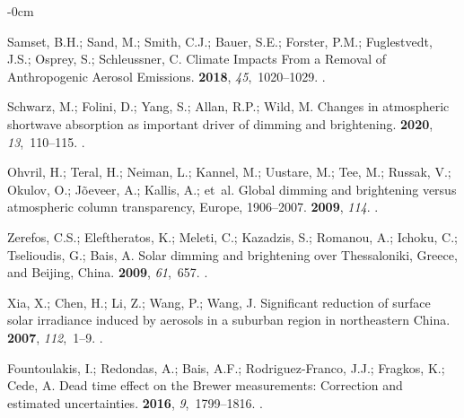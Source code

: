 \documentclass[applsci,article,accept,moreauthors,pdftex]{Definitions/mdpi}
\begin{document}
\begin{adjustwidth}{-\extralength}{0cm}
\begin{thebibliography}{999}
Samset, B.H.; Sand, M.; Smith, C.J.; Bauer, S.E.; Forster, P.M.; Fuglestvedt,
  J.S.; Osprey, S.; Schleussner, C.
\newblock Climate Impacts From a Removal of Anthropogenic Aerosol Emissions.
 {\bf 2018}, {\em 45},~1020--1029.
.

Schwarz, M.; Folini, D.; Yang, S.; Allan, R.P.; Wild, M.
\newblock Changes in atmospheric shortwave absorption as important driver of
  dimming and brightening.
 {\bf 2020}, {\em 13},~110--115.
.

Ohvril, H.; Teral, H.; Neiman, L.; Kannel, M.; Uustare, M.; Tee, M.; Russak,
  V.; Okulov, O.; Jõeveer, A.; Kallis, A.;  et~al.
\newblock Global dimming and brightening versus atmospheric column
  transparency, Europe, 1906–2007.
 {\bf 2009}, {\em 114}.
.

Zerefos, C.S.; Eleftheratos, K.; Meleti, C.; Kazadzis, S.; Romanou, A.; Ichoku,
  C.; Tselioudis, G.; Bais, A.
\newblock Solar dimming and brightening over Thessaloniki, Greece, and Beijing,
  China.
 {\bf 2009}, {\em
  61},~657.
.

Xia, X.; Chen, H.; Li, Z.; Wang, P.; Wang, J.
\newblock Significant reduction of surface solar irradiance induced by aerosols
  in a suburban region in northeastern China.
 {\bf 2007}, {\em
  112},~1--9.
.

Fountoulakis, I.; Redondas, A.; Bais, A.F.; Rodriguez-Franco, J.J.; Fragkos,
  K.; Cede, A.
\newblock Dead time effect on the Brewer measurements: Correction and estimated
  uncertainties.
 {\bf 2016}, {\em
  9},~1799--1816.
.


\end{thebibliography}
\end{adjustwidth}
\end{document}
